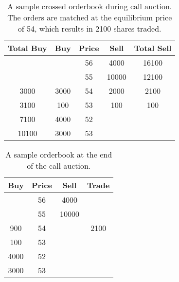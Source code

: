 \documentclass{article}
\begin{document}
\begin{table}[]\label{itayoseTable1}
\centering
\begin{tabular}{c|c|c|c|c}
\hline
\textbf{Total Buy} & \textbf{Buy} & \textbf{Price} & \textbf{Sell} & \textbf{Total Sell} \\ \hline
                            &                             & 56             & 4000                   & 16100                        \\ \hline
                            &                             & 55             & 10000                  & 12100                        \\ \hline
3000                        & 3000                        & 54             & 2000                   & 2100                         \\ \hline
3100                        & 100                         & 53             & 100                    & 100                          \\ \hline
7100                        & 4000                        & 52             &                        &                              \\ \hline
10100                       & 3000                        & 53             &                        &                              \\ \hline
\end{tabular}

\caption{A sample crossed orderbook during call auction. The orders are matched at the equilibrium price of 54, which results in 2100 shares traded.}
\end{table}


\begin{table}[]\label{itayoseTable2}
\centering
\begin{tabular}{c|c|c|c}
\hline
\textbf{Buy} & \textbf{Price} & \textbf{Sell} & \textbf{Trade} \\ \hline
                            & 56             & 4000                   &                        \\ \hline
                            & 55             & 10000                  &                        \\ \hline
900                         & 54             &                        & 2100                   \\ \hline
100                         & 53             &                        &                        \\ \hline
4000                        & 52             &                        &                        \\ \hline
3000                        & 53             &                        &                        \\ \hline
\end{tabular}
\caption{A sample orderbook at the end of the call auction.}
\end{table}
\end{document}
